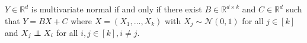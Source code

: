 \begin{definition}

\(Y \in \mathbb{R}^d\) is multivariate normal if and only if there exist \(B \in \mathbb{R}^{d \times k}\) and \(C \in \mathbb{R}^d\) such that \(Y = BX + C\) where \(X = (X_1, \ldots, X_k)\) with \(X_j \sim \mathcal{N}(0,1)\) for all \(j \in [k]\) and \(X_j \indep X_i\) for all \(i, j \in [k], i \neq j\).

\end{definition}

%
%

